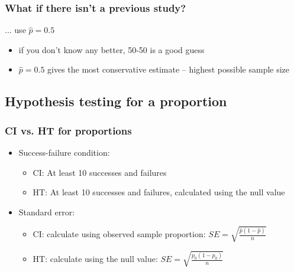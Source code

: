 
\begin{frame}
\frametitle{What if there isn't a previous study?}

... use $\hat{p} = 0.5$

\vspace{1cm}

\pause

\begin{itemize}
\item if you don't know any better, 50-50 is a good guess
\pause
\item $\hat{p} = 0.5$ gives the most conservative estimate -- highest possible sample size
\end{itemize}

\end{frame}


\subsection{Hypothesis testing for a proportion}


\begin{frame}
\frametitle{CI vs. HT for proportions}

\begin{itemize}

\item Success-failure condition:
\begin{itemize}
\item CI: At least 10  successes and failures
\item HT: At least 10  successes and failures, calculated using the null value
\end{itemize}

\item Standard error:
\begin{itemize}
\item CI: calculate using observed sample proportion: $SE = \sqrt{\frac{\hat{p}(1-\hat{p})}{n}}$
\item HT: calculate using the null value: $SE = \sqrt{\frac{p_0(1-p_0)}{n}}$
\end{itemize}

\end{itemize}

\end{frame}


